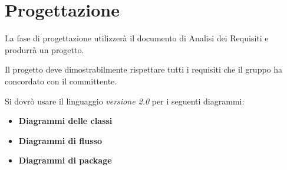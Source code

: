 \section{Progettazione}

La fase di progettazione utilizzerà il documento di Analisi dei Requisiti e produrrà un progetto.

Il progetto deve dimostrabilmente rispettare tutti i requisiti che il gruppo ha concordato con il committente.

Si dovrò usare il linguaggio  \emph{versione 2.0} per i seguenti diagrammi:
\begin{itemize}
 \item \textbf{Diagrammi delle classi} %
 \item \textbf{Diagrammi di flusso} %
 \item \textbf{Diagrammi di package} %
\end{itemize}

